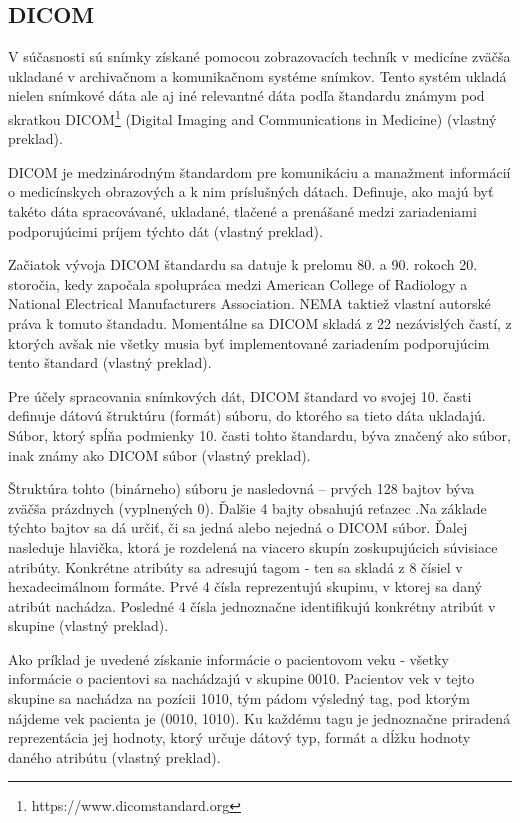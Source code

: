 \subsection {DICOM}\label{dicom}
V súčasnosti sú snímky získané pomocou zobrazovacích techník v medicíne zväčša ukladané v archivačnom a komunikačnom systéme snímkov. Tento systém ukladá nielen snímkové dáta ale aj iné relevantné dáta podľa štandardu známym pod skratkou DICOM\footnote{https://www.dicomstandard.org} (Digital Imaging and Communications in Medicine) \cite{Varma_2012} (vlastný preklad).

DICOM je medzinárodným štandardom pre komunikáciu a manažment informácií o medicínskych obrazových a k nim príslušných dátach. Definuje, ako majú byť takéto dáta spracovávané, ukladané, tlačené a prenášané medzi zariadeniami podporujúcimi príjem týchto dát \cite{about_dicomlibrary} (vlastný preklad).

Začiatok vývoja DICOM štandardu sa datuje k prelomu 80. a 90. rokoch 20. storočia, kedy započala spolupráca medzi American College of Radiology a National Electrical Manufacturers Association. NEMA taktiež vlastní autorské práva k tomuto štandadu. Momentálne sa DICOM skladá z 22 nezávislých častí, z ktorých avšak nie všetky musia byť implementované zariadením podporujúcim tento štandard \cite{dicom_history} (vlastný preklad).

Pre účely spracovania snímkových dát, DICOM štandard vo svojej 10. časti definuje dátovú štruktúru (formát) súboru, do ktorého sa tieto dáta ukladajú. Súbor, ktorý spĺňa podmienky 10. časti tohto štandardu, býva značený ako  súbor, inak známy ako DICOM súbor \cite{Varma_2012} (vlastný preklad).

Štruktúra tohto (binárneho) súboru je nasledovná -- prvých 128 bajtov býva zväčša prázdnych (vyplnených 0). Ďalšie 4 bajty obsahujú reťazec .\newline Na základe týchto bajtov sa dá určiť, či sa jedná alebo nejedná o DICOM súbor. Ďalej nasleduje hlavička, ktorá je rozdelená na viacero skupín zoskupujúcich súvisiace atribúty. Konkrétne atribúty sa adresujú tagom - ten sa skladá z 8 čísiel v hexadecimálnom formáte. Prvé 4 čísla reprezentujú skupinu, v ktorej sa daný atribút nachádza. Posledné 4 čísla jednoznačne identifikujú konkrétny atribút v skupine \cite{Varma_2012} (vlastný preklad).

Ako príklad je uvedené získanie informácie o pacientovom veku - všetky informácie o pacientovi sa nachádzajú v skupine 0010. Pacientov vek v tejto skupine sa nachádza na pozícii 1010, tým pádom výsledný tag, pod ktorým nájdeme vek pacienta je (0010, 1010). Ku každému tagu je jednoznačne priradená reprezentácia jej hodnoty, ktorý určuje dátový typ, formát a dĺžku hodnoty daného atribútu  \cite{Varma_2012} (vlastný preklad).

